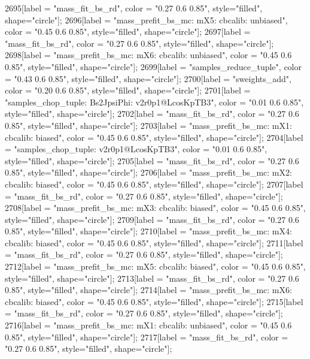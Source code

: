 {	2695[label = "mass_fit_bs_rd", color = "0.27 0.6 0.85", style="filled", shape="circle"];
	2696[label = "mass_prefit_bs_mc\nmassbin: mX5\nmassmodel: cbcalib\ntrigger: unbiased", color = "0.45 0.6 0.85", style="filled", shape="circle"];
	2697[label = "mass_fit_bs_rd", color = "0.27 0.6 0.85", style="filled", shape="circle"];
	2698[label = "mass_prefit_bs_mc\nmassbin: mX6\nmassmodel: cbcalib\ntrigger: unbiased", color = "0.45 0.6 0.85", style="filled", shape="circle"];
	2699[label = "samples_reduce_tuple", color = "0.43 0.6 0.85", style="filled", shape="circle"];
	2700[label = "sweights_add", color = "0.20 0.6 0.85", style="filled", shape="circle"];
	2701[label = "samples_chop_tuple\nmode: Bs2JpsiPhi\nversion: v2r0p1@LcosKpTB3", color = "0.01 0.6 0.85", style="filled", shape="circle"];
	2702[label = "mass_fit_bs_rd", color = "0.27 0.6 0.85", style="filled", shape="circle"];
	2703[label = "mass_prefit_bs_mc\nmassbin: mX1\nmassmodel: cbcalib\ntrigger: biased", color = "0.45 0.6 0.85", style="filled", shape="circle"];
	2704[label = "samples_chop_tuple\nversion: v2r0p1@LcosKpTB3", color = "0.01 0.6 0.85", style="filled", shape="circle"];
	2705[label = "mass_fit_bs_rd", color = "0.27 0.6 0.85", style="filled", shape="circle"];
	2706[label = "mass_prefit_bs_mc\nmassbin: mX2\nmassmodel: cbcalib\ntrigger: biased", color = "0.45 0.6 0.85", style="filled", shape="circle"];
	2707[label = "mass_fit_bs_rd", color = "0.27 0.6 0.85", style="filled", shape="circle"];
	2708[label = "mass_prefit_bs_mc\nmassbin: mX3\nmassmodel: cbcalib\ntrigger: biased", color = "0.45 0.6 0.85", style="filled", shape="circle"];
	2709[label = "mass_fit_bs_rd", color = "0.27 0.6 0.85", style="filled", shape="circle"];
	2710[label = "mass_prefit_bs_mc\nmassbin: mX4\nmassmodel: cbcalib\ntrigger: biased", color = "0.45 0.6 0.85", style="filled", shape="circle"];
	2711[label = "mass_fit_bs_rd", color = "0.27 0.6 0.85", style="filled", shape="circle"];
	2712[label = "mass_prefit_bs_mc\nmassbin: mX5\nmassmodel: cbcalib\ntrigger: biased", color = "0.45 0.6 0.85", style="filled", shape="circle"];
	2713[label = "mass_fit_bs_rd", color = "0.27 0.6 0.85", style="filled", shape="circle"];
	2714[label = "mass_prefit_bs_mc\nmassbin: mX6\nmassmodel: cbcalib\ntrigger: biased", color = "0.45 0.6 0.85", style="filled", shape="circle"];
	2715[label = "mass_fit_bs_rd", color = "0.27 0.6 0.85", style="filled", shape="circle"];
	2716[label = "mass_prefit_bs_mc\nmassbin: mX1\nmassmodel: cbcalib\ntrigger: unbiased", color = "0.45 0.6 0.85", style="filled", shape="circle"];
	2717[label = "mass_fit_bs_rd", color = "0.27 0.6 0.85", style="filled", shape="circle"];
}
